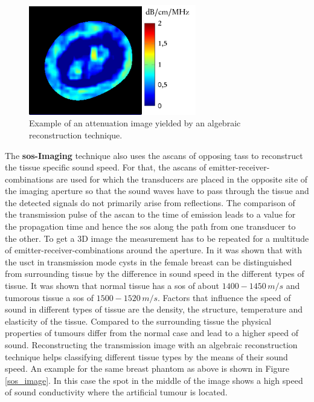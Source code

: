 \begin{figure}[H]
    \centering
    \includegraphics[width=0.65\textwidth]{Graphics/att_example.png}
    \caption{ Example of an attenuation image yielded by an algebraic reconstruction technique. }
    \label{att_image_example}
\end{figure}



\medskip

The \textbf{\ac{sos}-Imaging} technique also uses the \acp{ascan} of opposing \acp{tas} to reconstruct the tissue specific sound speed. For that, the \acp{ascan} of  emitter-receiver-combinations are used for which the transducers are placed in the opposite site of the imaging aperture so that the sound waves have to pass through the tissue and the detected signals do not primarily arise from reflections. The comparison of the transmission pulse of the \ac{ascan} to the time of emission leads to a value for the propagation time and hence the \ac{sos} along the path from one transducer to the other. To get a 3D image the measurement has to be repeated for a multitude of emitter-receiver-combinations around the aperture. In \cite{Greenleaf1981ClinicalTomography} it was shown that with the \ac{usct} in transmission mode cysts in the female breast can be distinguished from surrounding tissue by the difference in sound speed in the different types of tissue. It was shown that normal tissue has a \ac{sos} of about $1400-1450 \, m/s$ and tumorous tissue a \ac{sos} of $1500 - 1520\, m/s$. Factors that influence the speed of sound in different types of tissue are the density, the structure, temperature and elasticity of the tissue. Compared to the surrounding tissue the physical properties of tumours differ from the normal case and lead to a higher speed of sound. 
Reconstructing the transmission image with an algebraic reconstruction technique helps classifying different tissue types by the means of their sound speed. An example for the same breast phantom as above is shown in Figure \ref{sos_image}. In this case the spot in the middle of the image shows a high speed of sound conductivity where the artificial tumour is located.

